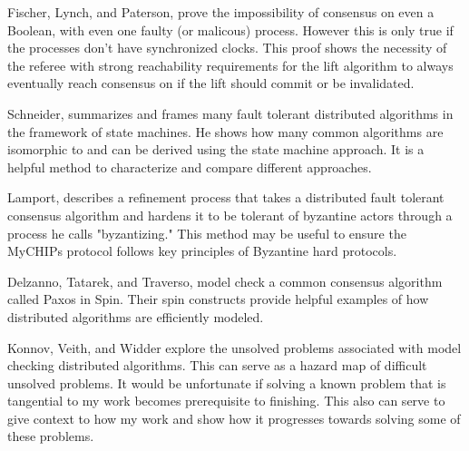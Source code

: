 \documentclass[article, onecolumn, 12pt]{IEEEtran}
\begin{document}
 
 Fischer, Lynch, and Paterson,\cite{Fischer} prove the impossibility of consensus on even a Boolean, with even one faulty (or malicous) process. However this is only true if the processes don't have synchronized clocks. This proof shows the necessity of the referee with strong reachability requirements for the lift algorithm to always eventually reach consensus on if the lift should commit or be invalidated.
 
 
 Schneider, summarizes and frames many fault tolerant distributed algorithms in the framework of state machines\cite{StateMachine}. He shows how many common algorithms are isomorphic to and can be derived using the state machine approach. It is a helpful method to characterize and compare different approaches.
 
 Lamport\cite{Lamport}, describes a refinement process that takes a distributed fault tolerant consensus algorithm and hardens it to be tolerant of byzantine actors through a process he calls "byzantizing." This method may be useful to ensure the MyCHIPs protocol follows key principles of Byzantine hard protocols.
 
 Delzanno, Tatarek, and Traverso, model check a common consensus algorithm called Paxos in Spin. Their spin constructs provide helpful examples of how distributed algorithms are efficiently modeled.\cite{Delzanno_2014}
 
 Konnov, Veith, and Widder explore the unsolved problems associated with model checking distributed algorithms. This can serve as a hazard map of difficult unsolved problems. It would be unfortunate if solving a known problem that is tangential to my work becomes prerequisite to finishing. This also can serve to give context to how my work and show how it progresses towards solving some of these problems.\cite{Konnov}



\end{document}
